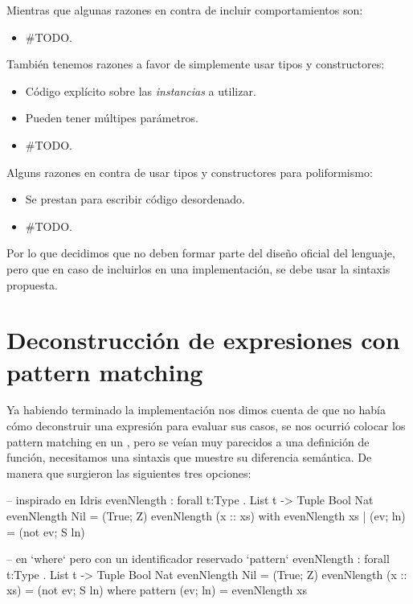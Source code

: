 {\begin{designfr}
Mientras que algunas razones en contra de incluir comportamientos son:

\begin{itemize}
    \item \#TODO.
\end{itemize}

También tenemos razones a favor de simplemente usar tipos y constructores:

\begin{itemize}
    \item Código explícito sobre las \emph{instancias} a utilizar.
    \item Pueden tener múltipes parámetros.
    \item \#TODO.
\end{itemize}

Alguns razones en contra de usar tipos y constructores para poliformismo:

\begin{itemize}
    \item Se prestan para escribir código desordenado.
    \item \#TODO.
\end{itemize}

Por lo que decidimos que no deben formar parte del diseño oficial del lenguaje, pero que en caso de incluirlos en una implementación, se debe usar la sintaxis propuesta.
\end{designfr}

\section{Deconstrucción de expresiones con pattern matching}

\begin{designfr}
Ya habiendo terminado la implementación nos dimos cuenta de que no había cómo deconstruir una expresión para evaluar sus casos, se nos ocurrió colocar los pattern matching en un , pero se veían muy parecidos a una definición de función, necesitamos una sintaxis que muestre su diferencia semántica. De manera que surgieron las siguientes tres opciones:

\begin{anglercode}[morekeywords={pattern}]
-- inspirado en Idris
evenNlength : forall t:Type . List t -> Tuple Bool Nat
evenNlength Nil = (True; Z)
evenNlength (x :: xs)
    with evenNlength xs
        | (ev; ln) = (not ev; S ln)

-- en `where` pero con un identificador reservado `pattern`
evenNlength : forall t:Type . List t -> Tuple Bool Nat
evenNlength Nil = (True; Z)
evenNlength (x :: xs) = (not ev; S ln)
    where
        pattern (ev; ln) = evenNlength xs


\end{anglercode}
\end{designfr}}
